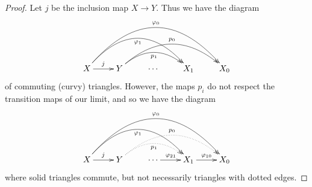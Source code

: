       \begin{proof}
        Let $j$ be the inclusion map $X\rightarrow Y$.
        Thus we have the diagram
        \begin{displaymath}
          \xymatrix{
            X \ar[r]^j \ar@/^37pt/[rrr]_{\varphi_1} \ar@/^50pt/[rrrr]^{\varphi_0}
            & Y \ar@/^20pt/[rr]_{p_1} \ar@/^30pt/[rrr]^{p_0}
            & \cdots
            & X_1
            & X_0
          }
        \end{displaymath}
        of commuting (curvy) triangles.
        However, the maps $p_i$ do not respect the transition maps of our limit, and so we have the diagram
        \begin{displaymath}
          \xymatrix{
            X \ar[r]^j \ar@/^37pt/[rrr]_{\varphi_1} \ar@/^50pt/[rrrr]^{\varphi_0}
            & Y \ar@/^20pt/@{..>}[rr]_{p_1} \ar@/^30pt/@{..>}[rrr]^{p_0}
            & \cdots \ar[r]^{\varphi_{21}}
            & X_1 \ar[r]^{\varphi_{10}}
            & X_0
          }
        \end{displaymath}
        where solid triangles commute, but not necessarily triangles with dotted edges.
        

\end{proof}
